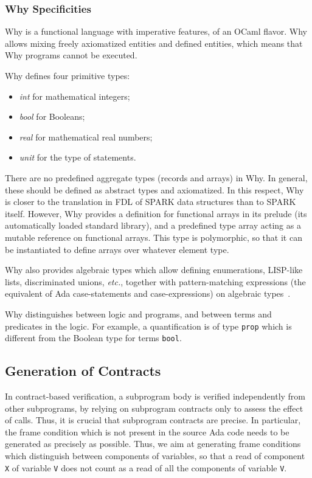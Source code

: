\documentclass[fullpage]{article}
\newcounter{example}
\newcommand{\etc}{\textit{etc.}\xspace}
\begin{document}
\subsubsection{Why Specificities}

Why is a functional language with imperative features, of an OCaml flavor. Why
allows mixing freely axiomatized entities and defined entities, which means
that Why programs cannot be executed.

Why defines four primitive types:
\begin{itemize}
\item \emph{int} for mathematical integers;
\item \emph{bool} for Booleans;
\item \emph{real} for mathematical real numbers;
\item \emph{unit} for the type of statements.
\end{itemize}

There are no predefined aggregate types (records and arrays) in Why. In
general, these should be defined as abstract types and axiomatized. In this
respect, Why is closer to the translation in FDL of SPARK data structures than
to SPARK itself. However, Why provides a definition for functional arrays in
its prelude (its automatically loaded standard library), and a predefined type
array acting as a mutable reference on functional arrays. This type is
polymorphic, so that it can be instantiated to define arrays over whatever
element type.

Why also provides algebraic types which allow defining enumerations, LISP-like
lists, discriminated unions, \etc, together with pattern-matching expressions
(the equivalent of Ada case-statements and case-expressions) on algebraic
types~\cite{Paskevich09RR}.

Why distinguishes between logic and programs, and between terms and predicates
in the logic. For example, a quantification is of type \verb|prop| which is
different from the Boolean type for terms \verb|bool|.

\subsection{Generation of Contracts}

In contract-based verification, a subprogram body is verified independently
from other subprograms, by relying on subprogram contracts only to assess the
effect of calls. Thus, it is crucial that subprogram contracts are precise. In
particular, the frame condition which is not present in the source Ada code
needs to be generated as precisely as possible. Thus, we aim at generating
frame conditions which distinguish between components of variables, so that a
read of component \verb|X| of variable \verb|V| does not count as a read of
all the components of variable \verb|V|.
\end{document}
